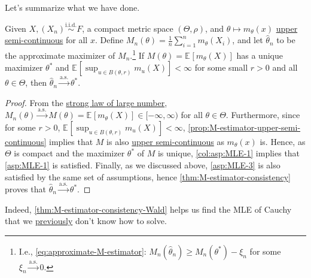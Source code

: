 Let's summarize what we have done.

\begin{theorem}[Wald]\label{thm:M-estimator-consistency-Wald}
	Given \(X, (X_n) \overset{\text{i.i.d.} }{\sim } F\), a compact metric space \((\Theta , \rho )\), and \(\theta \mapsto m_\theta (x)\) \hyperref[def:upper-semi-continuous]{upper semi-continuous} for all \(x\). Define \(M_n (\theta ) = \frac{1}{n}\sum_{i=1}^{n} m_\theta (X_i)\), and let \(\hat{\theta} _n\) to be the approximate maximizer of \(M_n\).\footnote{I.e., \autoref{eq:approximate-M-estimator}: \(M_n(\hat{\theta} _n) \geq M_n(\theta ^{\ast} ) - \xi _n\) for some \(\xi _n \overset{\text{a.s.} }{\to} 0\).} If \(M(\theta ) = \mathbb{E}_{}[m_\theta (X)] \) has a unique maximizer \(\theta ^{\ast} \) and \(\mathbb{E}_{}[\sup _{u \in B(\theta , r)} m_u (X) ] < \infty\) for some small \(r > 0\) and all \(\theta \in \Theta \), then \(\hat{\theta} _n \overset{\text{a.s.} }{\to} \theta ^{\ast} \).
\end{theorem}
\begin{proof}
	From the \hyperref[thm:SLLN]{strong law of large number}, \(M_n(\theta ) \overset{\text{a.s.} }{\to} M(\theta ) = \mathbb{E}_{}[m_\theta (X) ] \in [-\infty , \infty )\) for all \(\theta \in \Theta \). Furthermore, since for some \(r > 0\), \(\mathbb{E}_{}[\sup _{u \in B(\theta , r)} m_u(X)] < \infty \), \autoref{prop:M-estimator-upper-semi-continuous} implies that \(M\) is also \hyperref[def:upper-semi-continuous]{upper semi-continuous} as \(m_\theta (x)\) is. Hence, as \(\Theta \) is compact and the maximizer \(\theta ^{\ast} \) of \(M\) is unique, \autoref{col:asp:MLE-1} implies that \autoref{asp:MLE-1} is satisfied. Finally, as we discussed above, \autoref{asp:MLE-3} is also satisfied by the same set of assumptions, hence \autoref{thm:M-estimator-consistency} proves that \(\hat{\theta} _n \overset{\text{a.s.} }{\to} \theta ^{\ast} \).
\end{proof}

Indeed, \autoref{thm:M-estimator-consistency-Wald} helps us find the MLE of Cauchy that we \hyperref[eg:MLE-Cauchy]{previously} don't know how to solve.

